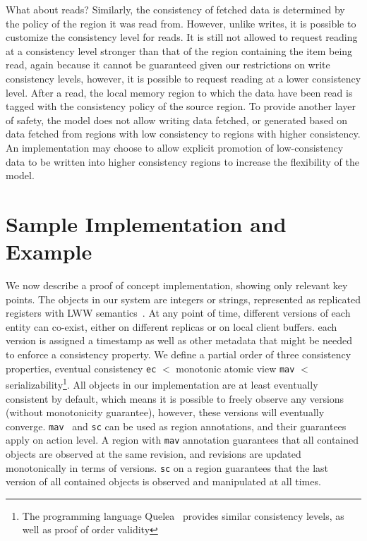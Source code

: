 \documentclass[preprint, numbers]{sigplanconf}
\begin{document}
What about reads? Similarly, the consistency of fetched data is determined by the
policy of the region it was read from. However, unlike writes, it is possible to
customize the consistency level for reads. It is still not allowed to request reading
at a consistency level stronger than that of the region containing the item
being read, again because it cannot be guaranteed given our restrictions on
write consistency levels, however, it is possible to
request reading at a lower consistency level. After a read, the local memory
region to which the data have been read is tagged with the consistency policy of
the source region. To provide another layer of safety, the model does not allow
writing data fetched, or generated based on data fetched from regions with low
consistency to regions with higher consistency. An implementation may choose to
allow explicit promotion of low-consistency data to be written into higher
consistency regions to increase the flexibility of the model.

%


\section{Sample Implementation and Example}
We now describe a proof of concept implementation, showing only
relevant key points. The objects in our system are integers or strings, represented as replicated registers with LWW
semantics~\cite{burckhardt2014replicated}. At any point of time, different versions of each entity can
co-exist, either on different replicas or on local client buffers. each version
is assigned a timestamp as well as other metadata that might be needed to
enforce a consistency property. We define a partial order of three consistency properties, eventual
consistency \texttt{ec} $<$ monotonic atomic view \texttt{mav} $<$
serializability\footnote{The programming language Quelea~\cite{sivaramakrishnan2015declarative} provides similar
  consistency levels, as well as proof of order validity}. All
objects in our implementation are at least eventually consistent by default, which means it
is possible to freely observe any versions (without monotonicity guarantee),
however, these versions will eventually converge. \texttt{mav}~\cite{bailis2013highly} and \texttt{sc}
can be used as region annotations, and their guarantees apply on action level. A region with \texttt{mav} annotation guarantees that all contained objects
are observed at the same revision, and revisions are updated monotonically in
terms of versions. \texttt{sc} on a region guarantees that the last version of all
contained objects is observed and manipulated at all times. 
\end{document}
